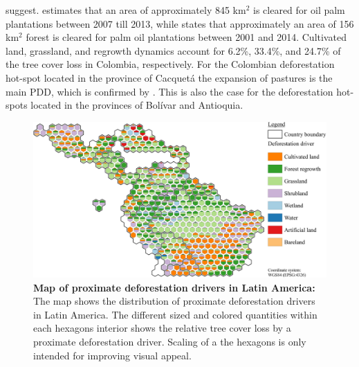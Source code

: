 \citet{Furumo2017} suggest. \citeauthor{Vijay2018} estimates that an area of approximately 845 km$^2$ is cleared for oil palm plantations between 2007 till 2013, while \citeauthor{Furumo2017} states that approximately an area of 156 km$^2$ forest is cleared for palm oil plantations between 2001 and 2014. Cultivated land, grassland, and regrowth dynamics account for 6.2\%, 33.4\%, and 24.7\% of the tree cover loss in Colombia, respectively. For the Colombian deforestation hot-spot located in the province of Cacquetá the expansion of pastures is the main \ac{PDD}, which is confirmed by \citet{Graesser2015}. This is also the case for the deforestation hot-spots located in the provinces of Bolívar and Antioquia.
			\begin{figure}[ht]
				\centering
				\includegraphics[scale=1]{img/americas_driver_frameless}
				\caption[Map of proximate deforestation drivers in Latin America]{\textbf{Map of proximate deforestation drivers in Latin America:} The map shows the distribution of proximate deforestation drivers in Latin America. The different sized and colored quantities within each hexagons interior shows the relative tree cover loss by a proximate deforestation driver. Scaling of a the hexagons is only intended for improving visual appeal.}
				\label{fig:americas_driver}
			\end{figure}


